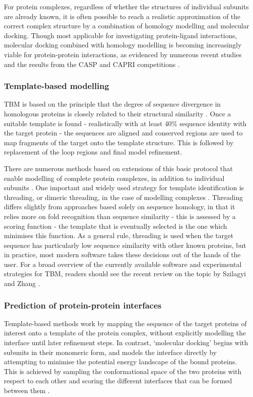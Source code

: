 \documentclass[a4paper,11pt,twoside,openright]{scrbook}
\begin{document}
For protein complexes, regardless of whether the structures of individual
subunits are already known, it is often possible to reach a realistic
approximation of the correct complex structure by a combination of homology
modelling and molecular docking. Though most applicable for investigating
protein-ligand interactions, molecular docking combined with homology modelling
is becoming increasingly viable for protein-protein interactions, as evidenced
by numerous recent studies and the results from the CASP and CAPRI competitions
\cite{Jiang2013,Rajapaksha2014,Agostino2016,Lensink2016}.

\subsubsection{Template-based modelling}
TBM is based on the principle that the degree of sequence divergence in
homologous proteins is closely related to their structural similarity
\cite{Chothia1986}. Once a suitable template is found - realistically with at
least 40\% sequence identity with the target protein - the sequences are aligned
and conserved regions are used to map fragments of the target onto the template
structure. This is followed by replacement of the loop regions and final model
refinement.

There are numerous methods based on extensions of this basic protocol that
enable modelling of complete protein complexes, in addition to individual
subunits \cite{Chen2008,Tuncbag2011,Guerler2013}. One important and widely used
strategy for template identification is threading, or dimeric threading, in the
case of modelling complexes \cite{Bowie1991,Lu2002}. Threading differs slightly
from approaches based solely on sequence homology, in that it relies more on
fold recognition than sequence similarity - this is assessed by a scoring
function - the template that is eventually selected is the one which minimises
this function. As a general rule, threading is used when the target sequence has
particularly low sequence similarity with other known proteins, but in practice,
most modern software takes these decisions out of the hands of the user. For a
broad overview of the currently available software and experimental strategies
for TBM, readers should see the recent review on the topic by Szilagyi and Zhang
\cite{Szilagyi2014}.

\subsubsection{Prediction of protein-protein interfaces}
Template-based methods work by mapping the sequence of the target proteins of
interest onto a template of the protein complex, without explicitly modelling
the interface until later refinement steps. In contrast, `molecular docking'
begins with subunits in their monomeric form, and models the interface directly
by attempting to minimise the potential energy landscape of the bound proteins.
This is achieved by sampling the conformational space of the two proteins with
respect to each other and scoring the different interfaces that can be formed
between them \cite{Huang2014}.
\end{document}
